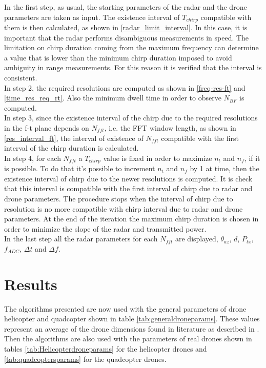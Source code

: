 In the first step, as usual, the starting parameters of the radar and the drone parameters are taken as input. The existence interval of $T_{chirp}$ compatible with them is then calculated, as shown in \ref{radar_limit_interval}. In this case, it is important that the radar performs disambiguous measurements in speed. The limitation on chirp duration coming from the maximum frequency can determine a value that is lower than the minimum chirp duration imposed to avoid ambiguity in range measurements. For this reason it is verified that the interval is consistent.\\
In step 2, the required resolutions are computed as shown in \ref{freq-res-ft} and \ref{time_res_req_rt}. Also the minimum dwell time in order to observe $N_{BF}$ is computed.\\
In step 3, since the existence interval of the chirp due to the required resolutions in the f-t plane depends on $N_{fft}$, i.e. the FFT window length, as shown in \ref{res_interval_ft}, the interval of existence of $N_{fft}$ compatible with the first interval of the chirp duration is calculated.\\
In step 4, for each $N_{fft}$ a $T_{chirp}$ value is fixed in order to maximize $n_{t}$ and $n_{f}$, if it is possible. To do that it's possible to increment $n_{t}$ and $n_{f}$ by 1 at time, then the existence interval of chirp due to the newer resolutions is computed. It is check that this interval is compatible with the first interval of chirp due to radar and drone parameters. The procedure stops when the interval of chirp due to resolution is no more compatible with chirp interval due to radar and drone parameters. At the end of the iteration the maximum chirp duration is chosen in order to minimize the slope of the radar and transmitted power.\\
In the last step all the radar parameters for each $N_{fft}$ are displayed, $\theta_{az}$, $d$, $P_{tx}$, $f_{ADC}$, $\Delta t$ and $\Delta f$.


\section{Results}
The algorithms presented are now used with the general parameters of drone helicopter and quadcopter shown in table \ref{tab:generaldroneparams}. These values represent an average of the drone dimensions found in literature as described in \cite{tesiligresti}.
Then the algorithms are also used with the parameters of real drones shown in tables \ref{tab:Helicopterdroneparams} for the helicopter drones and \ref{tab:quadcoptersparams} for the quadcopter drones. 


